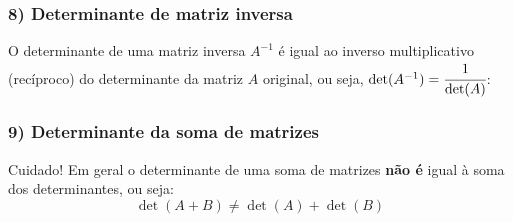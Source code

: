 \documentclass[pdftex, brazil, aspectratio=169]{beamer}
\begin{document}
\begin{frame}[t]
  \frametitle{8) Determinante de matriz inversa}
  O determinante de uma matriz inversa $A^{-1}$ é igual ao inverso
  multiplicativo (recíproco) do determinante da matriz $A$ original, ou seja,
  $\det(A^{-1}) = \cfrac{1}{\det(A)}$:

\end{frame}

\begin{frame}[t]
  \frametitle{9) Determinante da soma de matrizes}
  \begin{alertblock}{Cuidado!}
    Em geral o determinante de uma soma de matrizes \textbf{não é} igual à soma
    dos determinantes, ou seja: $$\det(A + B) \ne \det(A) + \det(B)$$
  \end{alertblock}

\end{frame}
\end{document}
